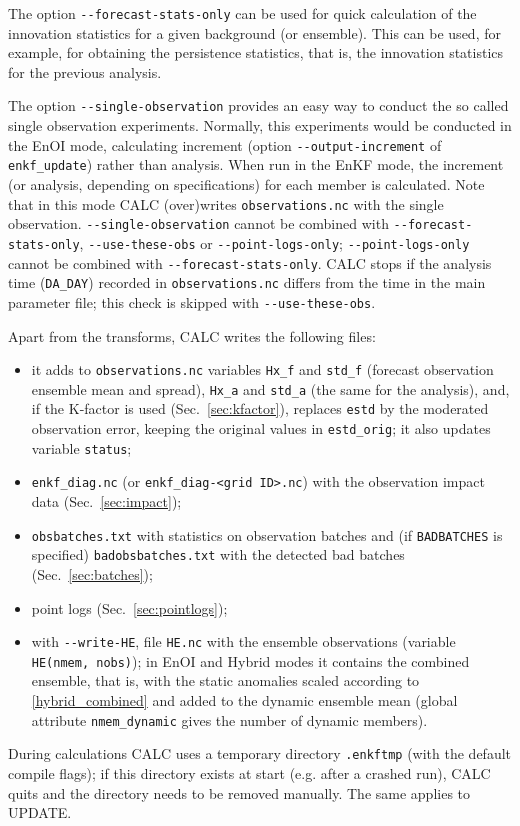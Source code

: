 \documentclass[11pt]{report}
\begin{document}
The option \verb|--forecast-stats-only| can be used for quick calculation of the innovation statistics for a given background (or ensemble).
This can be used, for example, for obtaining the persistence statistics, that is, the innovation statistics for the previous analysis.

The option \verb|--single-observation| provides an easy way to conduct the so called single observation experiments.
Normally, this experiments would be conducted in the EnOI mode, calculating increment (option \verb|--output-increment| of \verb|enkf_update|) rather than analysis.
When run in the EnKF mode, the increment (or analysis, depending on specifications) for each member is calculated.
Note that in this mode CALC (over)writes \verb|observations.nc| with the single observation.
\verb|--single-observation| cannot be combined with \verb|--forecast-stats-only|, \verb|--use-these-obs| or \verb|--point-logs-only|; \verb|--point-logs-only| cannot be combined with \verb|--forecast-stats-only|.
CALC stops if the analysis time (\verb|DA_DAY|) recorded in \verb|observations.nc| differs from the time in the main parameter file; this check is skipped with \verb|--use-these-obs|.

Apart from the transforms, CALC writes the following files:
\begin{itemize}
\item it adds to \verb|observations.nc| variables \verb|Hx_f| and \verb|std_f| (forecast observation ensemble mean and spread), \verb|Hx_a| and \verb|std_a| (the same for the analysis), and, if the K-factor is used (Sec.~\ref{sec:kfactor}), replaces \verb|estd| by the moderated observation error, keeping the original values in \verb|estd_orig|; it also updates variable \verb|status|;
\item \verb|enkf_diag.nc| (or \verb|enkf_diag-<grid ID>.nc|) with the observation impact data (Sec.~\ref{sec:impact});
\item \verb|obsbatches.txt| with statistics on observation batches and (if \verb|BADBATCHES| is specified) \verb|badobsbatches.txt| with the detected bad batches (Sec.~\ref{sec:batches});
\item point logs (Sec.~\ref{sec:pointlogs});
\item with \verb|--write-HE|, file \verb|HE.nc| with the ensemble observations (variable \verb|HE(nmem, nobs)|); in EnOI and Hybrid modes it contains the combined ensemble, that is, with the static anomalies scaled according to \eqref{hybrid_combined} and added to the dynamic ensemble mean (global attribute \verb|nmem_dynamic| gives the number of dynamic members).
\end{itemize}
During calculations CALC uses a temporary directory \verb|.enkftmp| (with the default compile flags); if this directory exists at start (e.g. after a crashed run), CALC quits and the directory needs to be removed manually.
The same applies to UPDATE.
\end{document}
